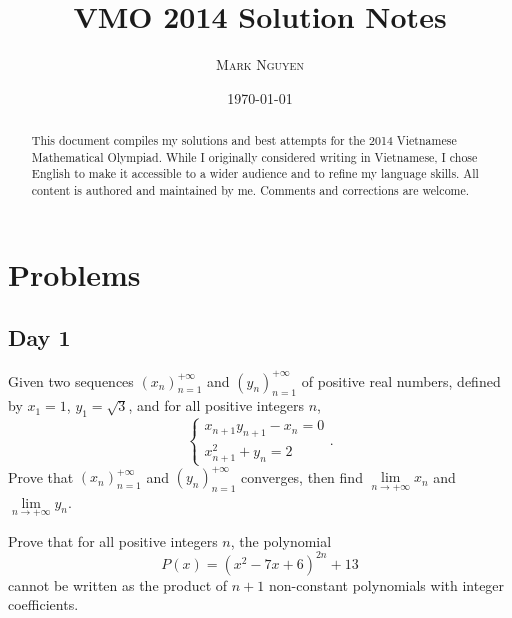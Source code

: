 \documentclass[11pt]{article}
\title{\textbf{\Huge VMO 2014 Solution Notes}}
\author{\LARGE \textsc{Mark Nguyen}}
\date{\sffamily\today}
\begin{document}
\maketitle

\begin{abstract}
    This document compiles my solutions and best attempts for the 2014 Vietnamese Mathematical Olympiad. While I originally considered writing in Vietnamese, I chose English to make it accessible to a wider audience and to refine my language skills. All content is authored and maintained by me. Comments and corrections are welcome.
\end{abstract}

\tableofcontents

\newpage

\section{Problems}

    \subsection*{Day 1}

        \begin{exercise}
            Given two sequences \((x_n)_{n=1}^{+\infty}\) and \((y_n)_{n=1}^{+\infty}\) of positive real numbers, defined by \(x_1 = 1\), \(y_1 = \sqrt{3}\), and for all positive integers \(n\),
            \[\begin{cases}
                x_{n+1}y_{n+1} - x_n = 0 \\
                x_{n+1}^2 + y_n = 2
            \end{cases}.\]
            Prove that \((x_n)_{n=1}^{+\infty}\) and \((y_n)_{n=1}^{+\infty}\) converges, then find \(\lim\limits_{n \to +\infty} x_n\) and \(\lim\limits_{n \to +\infty} y_n\).
        \end{exercise}
    
        \boom
    
        \begin{exercise}
            Prove that for all positive integers \(n\), the polynomial
            \[P(x) = (x^2 - 7x + 6)^{2n} + 13\]
            cannot be written as the product of \(n + 1\) non-constant polynomials with integer coefficients.
        \end{exercise}
    
        \boom
    
\end{document}
